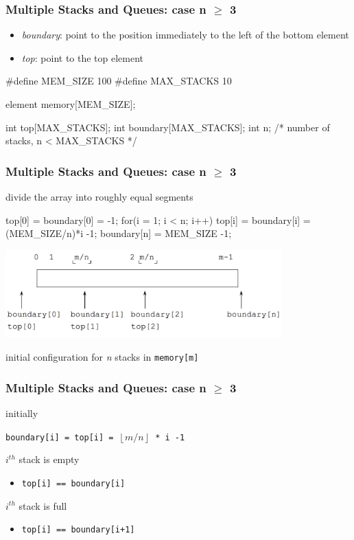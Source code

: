\documentclass[newPxFont,sthlmFooter,nooffset]{beamer}
\begin{document}
\begin{frame}[t, fragile]
  \frametitle{Multiple Stacks and Queues: case n $\geq$ 3}
\begin{itemize}
\item \textit{boundary}: point to the position immediately to the left of the bottom element
\item \textit{top}: point to the top element
\end{itemize}
\begin{ncodedef}
#define MEM_SIZE 100
#define MAX_STACKS 10

element memory[MEM_SIZE];

int top[MAX_STACKS];
int boundary[MAX_STACKS];
int n; /* number of stacks, n < MAX_STACKS */
\end{ncodedef}
\end{frame}

\begin{frame}[t, fragile]
  \frametitle{Multiple Stacks and Queues: case n $\geq$ 3}
divide the array into roughly equal segments
\begin{ncodedef}
top[0] = boundary[0] = -1;
for(i = 1; i < n; i++)
    top[i] = boundary[i] = (MEM_SIZE/n)*i -1;
boundary[n] = MEM_SIZE -1;
\end{ncodedef}

  \begin{center}
    \includegraphics[width=0.8\textwidth]{figures/fig09_boundary.png}
  \end{center}
initial configuration for \textit{n} stacks in \texttt{memory[m]}
\end{frame}

\begin{frame}[t]
  \frametitle{Multiple Stacks and Queues: case n $\geq$ 3}
initially

\texttt{boundary[i] = top[i] = $\left\lfloor m/n\right\rfloor$ * i -1}

$i^{th}$ stack is empty
\begin{itemize}
\item \texttt{top[i] == boundary[i]}
\end{itemize}

$i^{th}$ stack is full
\begin{itemize}
\item \texttt{top[i] == boundary[i+1]}
\end{itemize}

\end{frame}
\end{document}

